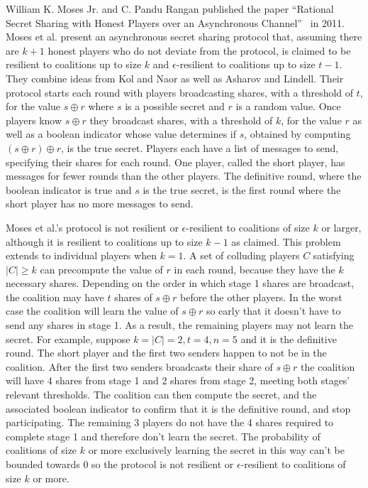 \documentclass{dalcsthesis}
\begin{document}
William K. Moses Jr. and C. Pandu Rangan published the paper ``Rational Secret Sharing with Honest Players over an Asynchronous Channel''~\cite{moses11} in 2011. Moses et al. present an asynchronous secret sharing protocol that, assuming there are $k+1$ honest players who do not deviate from the protocol, is claimed to be resilient to coalitions up to size $k$ and $\epsilon$-resilient to coalitions up to size $t-1$. They combine ideas from Kol and Naor as well as Asharov and Lindell. Their protocol starts each round with players broadcasting shares, with a threshold of $t$, for the value $s \oplus r$ where $s$ is a possible secret and $r$ is a random value. Once players know $s \oplus r$ they broadcast shares, with a threshold of $k$, for the value $r$ as well as a boolean indicator whose value determines if $s$, obtained by computing $(s \oplus r) \oplus r$, is the true secret. Players each have a list of messages to send, specifying their shares for each round. One player, called the short player, has messages for fewer rounds than the other players. The definitive round, where the boolean indicator is true and $s$ is the true secret, is the first round where the short player has no more messages to send.

Moses et al.'s protocol is not resilient or $\epsilon$-resilient to coalitions of size $k$ or larger, although it is resilient to coalitions up to size $k-1$ as claimed. This problem extends to individual players when $k=1$. A set of colluding players $C$ satisfying $|C| \geq k$ can precompute the value of $r$ in each round, because they have the $k$ necessary shares. Depending on the order in which stage 1 shares are broadcast, the coalition may have $t$ shares of $s \oplus r$ before the other players. In the worst case the coalition will learn the value of $s \oplus r$ so early that it doesn't have to send any shares in stage 1. As a result, the remaining players may not learn the secret. For example, suppose $k=|C|=2, t=4, n=5$ and it is the definitive round. The short player and the first two senders happen to not be in the coalition. After the first two senders broadcasts their share of $s \oplus r$ the coalition will have 4 shares from stage 1 and 2 shares from stage 2, meeting both stages' relevant thresholds. The coalition can then compute the secret, and the associated boolean indicator to confirm that it is the definitive round, and stop participating. The remaining 3 players do not have the 4 shares required to complete stage 1 and therefore don't learn the secret. The probability of coalitions of size $k$ or more exclusively learning the secret in this way can't be bounded towards 0 so the protocol is not resilient or $\epsilon$-resilient to coalitions of size $k$ or more.
\end{document}
